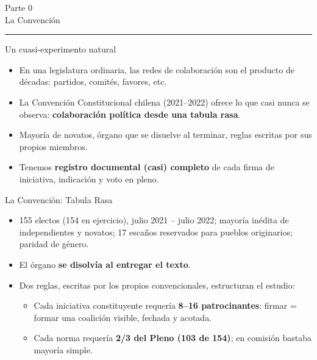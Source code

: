 \documentclass[aspectratio=169,11pt]{beamer}
\newcommand{\emphr}[1]{{\color{ndreddark}\textbf{#1}}}
\newcommand{\sectionslide}[2]{%
  \begin{frame}[plain]
    \vfill
    \begin{center}
      {\footnotesize\color{ndgray} #1}\\[6pt]
      {\Large #2}\\[2pt]
      {\color{ndred}\rule{0.30\textwidth}{1.1pt}}
    \end{center}
    \vfill
  \end{frame}}
\begin{document}
\sectionslide{Parte 0}{La Convención}

\begin{frame}{Un cuasi-experimento natural}
\begin{itemize}
  \item En una legislatura ordinaria, las redes de colaboración son el producto de décadas: partidos, comités, favores, etc.
  \vspace{0.35cm}
  \item La Convención Constitucional chilena (2021--2022) ofrece lo que casi nunca se observa: \emphr{colaboración política desde una tabula rasa}.
  \vspace{0.35cm}
  \item Mayoría de novatos, órgano que se disuelve al terminar, reglas escritas por sus propios miembros.
  \vspace{0.35cm}
  \item Tenemos \emphr{registro documental (casi) completo} de cada firma de iniciativa, indicación y voto en pleno.
\end{itemize}
\end{frame}




\begin{frame}{La Convención: Tabula Rasa}
\begin{itemize}
  \item 155 electos (154 en ejercicio), julio 2021 -- julio 2022; mayoría inédita de independientes y novatos; 17 escaños reservados para pueblos originarios; paridad de género.
  \vspace{0.25cm}
  \item El órgano \emphr{se disolvía al entregar el texto}.
  \vspace{0.25cm}
  \item Dos reglas, escritas por los propios convencionales, estructuran el estudio:
  \begin{itemize}
    \item Cada iniciativa constituyente requería \emphr{8--16 patrocinantes}: firmar = formar una coalición visible, fechada y acotada.
    \item Cada norma requería \emphr{2/3 del Pleno (103 de 154)}; en comisión bastaba mayoría simple.
  \end{itemize}
  \vspace{0.25cm}
\end{itemize}
\end{frame}
\end{document}
